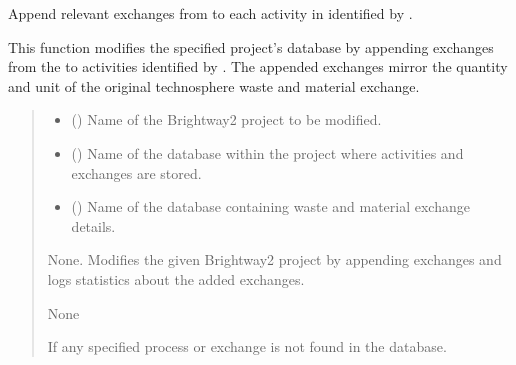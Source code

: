 \documentclass[letterpaper,10pt,english]{sphinxmanual}
\begin{document}
\begin{fulllineitems}
\label{\detokenize{WasteAndMaterialFootprint:WasteAndMaterialFootprint.ExchangeEditor.ExchangeEditor}}
\pysigstartsignatures
{}
\pysigstopsignatures
\sphinxAtStartPar
Append relevant exchanges from  to each activity in  identified by .

\sphinxAtStartPar
This function modifies the specified project’s database by appending exchanges from the  to activities identified by . The appended exchanges mirror the quantity and unit of the original technosphere waste and material exchange.
\begin{quote}\begin{description}
\begin{itemize}
\item {} 
\sphinxAtStartPar
{} () \textendash{} Name of the Brightway2 project to be modified.

\item {} 
\sphinxAtStartPar
{} () \textendash{} Name of the database within the project where activities and exchanges are stored.

\item {} 
\sphinxAtStartPar
{} () \textendash{} Name of the database containing waste and material exchange details.

\end{itemize}

\sphinxAtStartPar
None. Modifies the given Brightway2 project by appending exchanges and logs statistics about the added exchanges.

\sphinxAtStartPar
None

\sphinxAtStartPar
{} \textendash{} If any specified process or exchange is not found in the database.

\end{description}\end{quote}

\end{fulllineitems}
\end{document}

